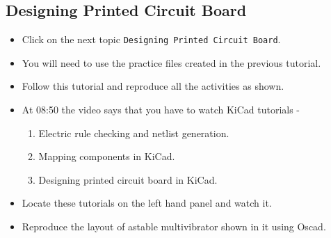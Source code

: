  
\subsection{Designing Printed Circuit Board}
\begin{itemize}
\item Click on the next topic {\tt Designing Printed Circuit Board}.

\item You will need to use the practice files created in the previous tutorial.
\item Follow this tutorial and reproduce all the activities as shown.
\item At 08:50 the video says that you have to watch KiCad tutorials - 
\begin{enumerate}
\item Electric rule checking and netlist generation.
\item Mapping components in KiCad.
\item Designing printed circuit board in KiCad.
\end{enumerate}
\item Locate these tutorials on the left hand panel and watch it.
\item Reproduce the layout of astable multivibrator shown in it using Oscad.
\end{itemize}



